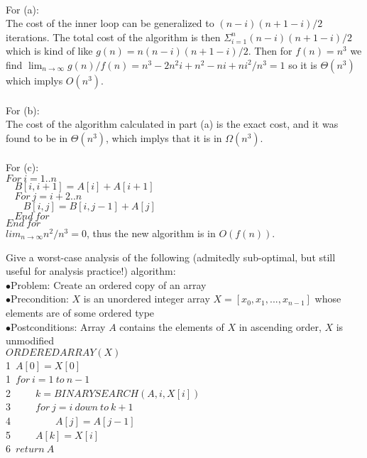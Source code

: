 \documentclass{assignment}
\begin{document}
\begin{problemlist}
\begin{problem}
\end{problem}
\begin{answer}
\\
For (a):\\
The cost of the inner loop can be generalized to $(n-i)(n+1-i)/2$ iterations. The total cost of the algorithm is then $\Sigma_{i=1}^n (n-i)(n+1-i)/2$ which is kind of like $g(n)=n(n-i)(n+1-i)/2$. Then for $f(n)=n^3$ we find $\lim_{n\rightarrow \infty}g(n)/f(n)=n^3-2n^2i+n^2-ni+ni^2/n^3=1$ so it is $\Theta (n^3)$ which implys $O(n^3)$.\\\\
For (b):\\
The cost of the algorithm calculated in part (a) is the exact cost, and it was found to be in $\Theta (n^3)$, which implys that it is in $\Omega (n^3)$.\\\\
For (c):\\
$For~i=1..n$\\
$~~~~B[i,i+1]=A[i]+A[i+1]$\\
$~~~~For~j=i+2..n$\\
$~~~~~~~~B[i,j]=B[i,j-1]+A[j]$\\
$~~~~End~for$\\
$End~for$\\
$lim_{n\rightarrow \infty}n^2/n^3=0$, thus the new algorithm is in $O(f(n))$.\\
\end{answer}
\clearpage
\pbitem
\begin{problem}
Give a worst-case analysis of the following (admitedly sub-optimal, but still useful for analysis practice!) algorithm:\\
$\bullet$Problem: Create an ordered copy of an array\\
$\bullet$Precondition: $X$ is an unordered integer array $X=[x_0,x_1,...,x_{n-1}]$ whose elements are of some ordered type\\
$\bullet$Postconditions: Array $A$ contains the elements of $X$ in ascending order, $X$ is unmodified\\
$ORDEREDARRAY(X)$\\
1~$A[0]=X[0]$\\
1~$for~i=1~to~n-1$\\
2~~~~~$k=BINARYSEARCH(A,i,X[i])$\\
3~~~~~$for~j=i~down~to~k+1$\\
4~~~~~~~~~$A[j]=A[j-1]$\\
5~~~~~$A[k]=X[i]$\\
6~$return~A$\\

\end{problem}
\end{problemlist}
\end{document}
